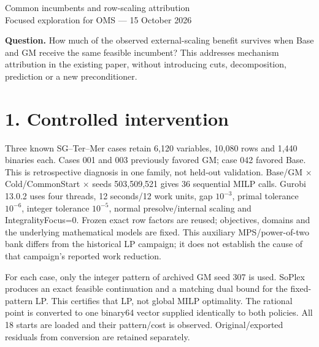 \documentclass[10pt,a4paper]{article}
\begin{document}
\begin{center}\Large Common incumbents and row-scaling attribution\\[3pt]
\normalsize Focused exploration for OMS --- 15 October 2026\end{center}
\textbf{Question.} How much of the observed external-scaling benefit survives
when Base and GM receive the same feasible incumbent? This addresses mechanism
attribution in the existing paper, without introducing cuts, decomposition,
prediction or a new preconditioner.

\section*{1. Controlled intervention}
Three known SG--Ter--Mer cases retain 6,120 variables, 10,080 rows and 1,440
binaries each. Cases 001 and 003 previously favored GM; case 042 favored Base.
This is retrospective diagnosis in one family, not held-out validation.
Base/GM $\times$ Cold/CommonStart $\times$ seeds 503,509,521 gives 36 sequential
MILP calls. Gurobi 13.0.2 uses four threads, 12 seconds/12 work units, gap
$10^{-3}$, primal tolerance $10^{-6}$, integer tolerance $10^{-5}$, normal
presolve/internal scaling and IntegralityFocus=0. Frozen exact row factors are
reused; objectives, domains and the underlying mathematical models are fixed.
This auxiliary MPS/power-of-two bank differs from the historical LP campaign;
it does not establish the cause of that campaign's reported work reduction.

For each case, only the integer pattern of archived GM seed 307 is used.
SoPlex produces an exact feasible continuation and a matching dual bound for
the fixed-pattern LP. This certifies that LP, not global MILP optimality.
The rational point is converted to one binary64 vector supplied identically to
both policies. All 18 starts are loaded and their pattern/cost is observed.
Original/exported residuals from conversion are retained separately.
\end{document}
